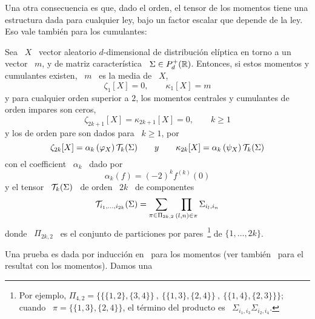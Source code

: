 Una otra consecuencia es que, dado el orden, el tensor de los momentos tiene una
estructura dada  para cualquier ley,  bajo un factor  escalar que depende  de la
ley.  Eso vale tambi\'en para los cumulantes:
%
\begin{teorema}\label{Teo:MP:MomentosCumulantesEliptica}
%
  Sea \  $X$ \  vector aleatorio $d$-dimensional  de distribuci\'on  el\'iptica en
  torno a  un  vector \  $m$,  y  de  matriz  caracter\'istica \  $\Sigma  \in
  P_d^+(\mathbb{R})$.  Entonces, si  estos momentos y cumulantes existen,  \ $m$ \ es
  la media de \ $X$, \ie
  \[
  \zeta_1[X] = 0, \qquad \kappa_1[X] = m
  \]
  y para cualquier orden superior a  $2$, los momentos centrales y cumulantes de
  orden impares son ceros,
  \[
  \zeta_{2 k + 1}[X] = \kappa_{2 k + 1}[X] = 0, \qquad k \ge 1
  \]
  y los de orden pare son dados para \ $k \ge 1$, por
  \[
  \zeta_{2 k}[X] = \alpha_k\left(  \varphi_X   \right) \mathcal{T}_k(\Sigma)
 \qquad  y \qquad \kappa_{2 k}[X] = \alpha_k\left(  \psi_X   \right) \mathcal{T}_k(\Sigma)
  \]
  con el coefficient \ $\alpha_k$ \ dado por
  \[
  \alpha_k(f) = (-2)^k f^{(k)}(0)
  \]
  y el tensor \ $\mathcal{T}_k(\Sigma)$ \ de orden \ $2 k$ \ de componentes
  \[
  \mathcal{T}_{i_1,\ldots,i_{2k}}(\Sigma) = \sum_{\pi \in \Pi_{2 k , 2}} \prod_{(l,n) \in
    \pi} \Sigma_{i_l,i_n}
  \]
  donde   \  $\Pi_{2   k  ,   2}$   \  es   el  conjunto   de  particiones   por
  pares~\footnote{Por  ejemplo, $\Pi_{4,2}  =  \Big\{ \big\{  \{1,2\} ,  \{3,4\}
    \big\} \:  , \: \big\{  \{1,3\} ,  \{2,4\} \big\} \:  , \: \big\{  \{1,4\} ,
    \{2,3\} \big\} \big\}$; cuando \ $\pi = \big\{ \{1,3\} , \{2,4\} \Big\}$, el
    t\'ermino del producto es \ $\Sigma_{i_1,i_3} \Sigma_{i_2,i_4}$.} de $\{ 1 ,
  \ldots , 2 k \}$.
\end{teorema}
%
Una prueba  es dada  por inducci\'on en~\cite{BerBen86}  para los  momentos (ver
tambi\'en~\cite[p.~44]{FanKot90} para el resultat  con los momentos).  Damos una
